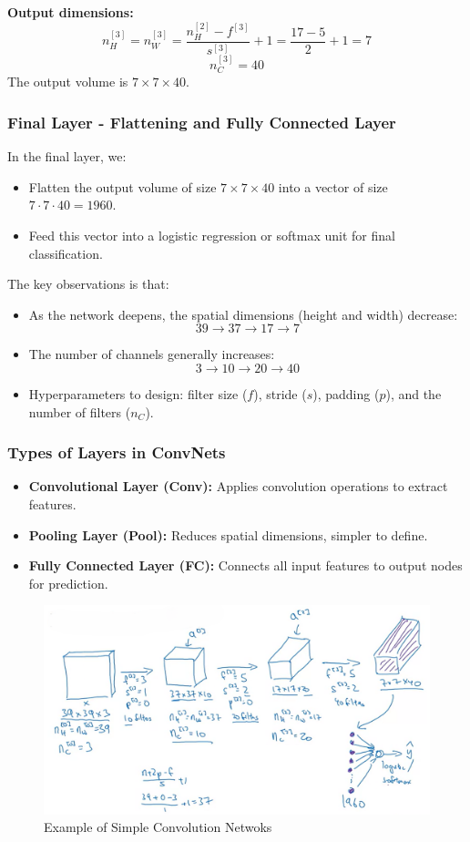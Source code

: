 \documentclass[letterpaper,12pt,notitlepage,twoside]{report}
\begin{document}
\textbf{Output dimensions:}
\[
n_H^{[3]} = n_W^{[3]} = \frac{n_H^{[2]} - f^{[3]}}{s^{[3]}} + 1 = \frac{17 - 5}{2} + 1 = 7
\]
\[
n_C^{[3]} = 40
\]
The output volume is $7 \times 7 \times 40$.

\subsubsection*{Final Layer - Flattening and Fully Connected Layer}
In the final layer, we:
\begin{itemize}[nosep]
    \item Flatten the output volume of size $7 \times 7 \times 40$ into a vector of size $7 \cdot 7 \cdot 40 = 1960$.
    \item Feed this vector into a logistic regression or softmax unit for final classification.
\end{itemize}

The key observations is that:
\begin{itemize}[nosep]
    \item As the network deepens, the spatial dimensions (height and width) decrease:
    \[
    39 \to 37 \to 17 \to 7
    \]
    \item The number of channels generally increases:
    \[
    3 \to 10 \to 20 \to 40
    \]
    \item Hyperparameters to design: filter size ($f$), stride ($s$), padding ($p$), and the number of filters ($n_C$).
\end{itemize}

\subsubsection*{Types of Layers in ConvNets}
\begin{itemize}
    \item \textbf{Convolutional Layer (Conv):} Applies convolution operations to extract features.
    \item \textbf{Pooling Layer (Pool):} Reduces spatial dimensions, simpler to define.
    \item \textbf{Fully Connected Layer (FC):} Connects all input features to output nodes for prediction.
\end{itemize}

\begin{figure}[h]
	\centering
	\includegraphics[width=\textwidth]{Images/ConvNet.png}
	\caption{Example of Simple Convolution Netwoks}
	\label{fig:28}
\end{figure}
\FloatBarrier
\end{document}
